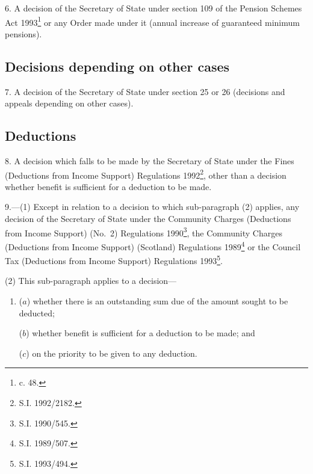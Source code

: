 \documentclass[12pt,a4paper]{article}
\begin{document}
6.  A decision of the Secretary of State under section 109 of the Pension Schemes Act 1993\footnote{ c. 48.} or any Order made under it (annual increase of guaranteed minimum pensions).

\subsection*{Decisions depending on other cases}

7.  A decision of the Secretary of State under section 25 or 26 (decisions and appeals depending on other cases).

\subsection*{Deductions}

8.  A decision which falls to be made by the Secretary of State under the Fines (Deductions from Income Support) Regulations 1992\footnote{\frenchspacing S.I. 1992/2182.}, other than 
a decision whether benefit is sufficient for a deduction to be made.  %


\medskip

9.—(1) Except in relation to a decision to which sub-paragraph (2) applies, any decision of the Secretary of State under the Community Charges (Deductions from Income Support) (No.\ 2) Regulations 1990\footnote{\frenchspacing S.I. 1990/545.}, the Community Charges (Deductions from Income Support) (Scotland) Regulations 1989\footnote{\frenchspacing S.I. 1989/507.} or the Council Tax (Deductions from Income Support) Regulations 1993\footnote{\frenchspacing S.I. 1993/494.}.

(2) This sub-paragraph applies to a decision—
\begin{enumerate}\item[]
($a$) whether there is an outstanding sum due of the amount sought to be deducted;

($b$) whether benefit is sufficient for a deduction to be made; and

($c$) on the priority to be given to any deduction.
\end{enumerate}
\end{document}
